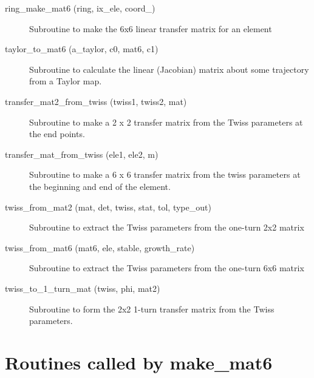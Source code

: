 \begin{description}
\item[ring\_make\_mat6 (ring, ix\_ele, coord\_)] \Newline
Subroutine to make the 6x6 linear transfer matrix for an element 

\item[taylor\_to\_mat6 (a\_taylor, c0, mat6, c1)] \Newline
Subroutine to calculate the linear (Jacobian) matrix about some trajectory from a Taylor map. 

\item[transfer\_mat2\_from\_twiss (twiss1, twiss2, mat)] \Newline
Subroutine to make a 2 x 2 transfer matrix from the Twiss parameters at the end points. 

\item[transfer\_mat\_from\_twiss (ele1, ele2, m)] \Newline 
Subroutine to make a 6 x 6 transfer matrix from the twiss parameters
at the beginning and end of the element.

\item[twiss\_from\_mat2 (mat, det, twiss, stat, tol, type\_out)] \Newline
Subroutine to extract the Twiss parameters from the one-turn 2x2 matrix 

\item[twiss\_from\_mat6 (mat6, ele, stable, growth\_rate)] \Newline
Subroutine to extract the Twiss parameters from the one-turn 6x6 matrix 

\item[twiss\_to\_1\_turn\_mat (twiss, phi, mat2)] \Newline
Subroutine to form the 2x2 1-turn transfer matrix from the Twiss parameters. 

\end{description}

\section{Routines called by make\_mat6}
\label{r:mat6}

